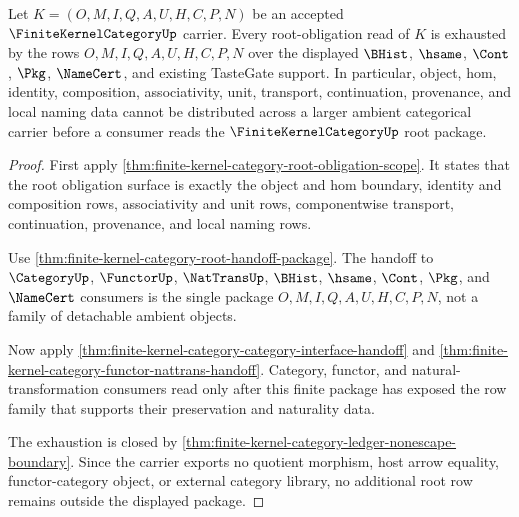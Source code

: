 \begin{theorem}
\label{thm:finite-kernel-category-row-scope-exhaustion}
Let $K=(O,M,I,Q,A,U,H,C,P,N)$ be an accepted $\FiniteKernelCategoryUp$ carrier. Every root-obligation read of $K$ is exhausted by the rows $O,M,I,Q,A,U,H,C,P,N$ over the displayed $\BHist$, $\hsame$, $\Cont$, $\Pkg$, $\NameCert$, and existing TasteGate support. In particular, object, hom, identity, composition, associativity, unit, transport, continuation, provenance, and local naming data cannot be distributed across a larger ambient categorical carrier before a consumer reads the $\FiniteKernelCategoryUp$ root package.
\end{theorem}
\begin{proof}
First apply \autoref{thm:finite-kernel-category-root-obligation-scope}. It states that the root obligation surface is exactly the object and hom boundary, identity and composition rows, associativity and unit rows, componentwise transport, continuation, provenance, and local naming rows.

Use \autoref{thm:finite-kernel-category-root-handoff-package}. The handoff to $\CategoryUp$, $\FunctorUp$, $\NatTransUp$, $\BHist$, $\hsame$, $\Cont$, $\Pkg$, and $\NameCert$ consumers is the single package $O,M,I,Q,A,U,H,C,P,N$, not a family of detachable ambient objects.

Now apply \autoref{thm:finite-kernel-category-category-interface-handoff} and \autoref{thm:finite-kernel-category-functor-nattrans-handoff}. Category, functor, and natural-transformation consumers read only after this finite package has exposed the row family that supports their preservation and naturality data.

The exhaustion is closed by \autoref{thm:finite-kernel-category-ledger-nonescape-boundary}. Since the carrier exports no quotient morphism, host arrow equality, functor-category object, or external category library, no additional root row remains outside the displayed package.
\end{proof}

